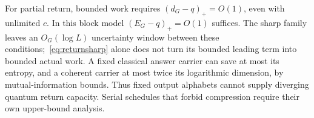 For partial return, bounded work requires $(d_G-q)_+=O(1)$, even with unlimited $c$. In this block model $(E_G-q)_+=O(1)$ suffices. The sharp family leaves an $O_G(\log L)$ uncertainty window between these conditions;~\eqref{eq:returnsharp} alone does not turn its bounded leading term into bounded actual work. A fixed classical answer carrier can save at most its entropy, and a coherent carrier at most twice its logarithmic dimension, by mutual-information bounds. Thus fixed output alphabets cannot supply diverging quantum return capacity. Serial schedules that forbid compression require their own upper-bound analysis.
